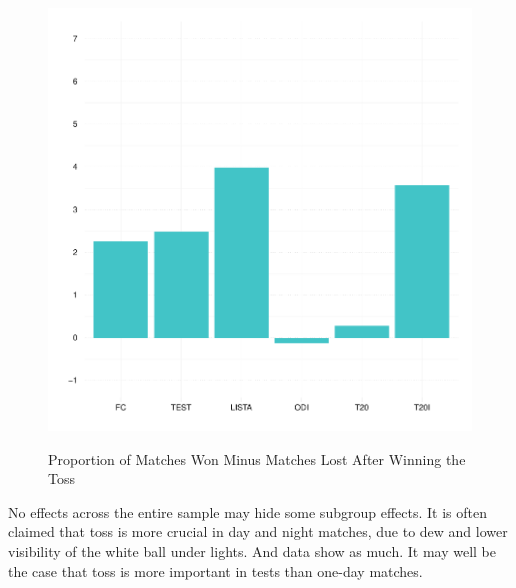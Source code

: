 \documentclass[11pt]{article}
\begin{document}
\begin{figure}[htbp]
\centering
\caption{Proportion of Matches Won Minus Matches Lost After Winning the Toss}
\includegraphics[scale=.75]{../figs/winbyType.pdf}
\label{fig:summary}
\end{figure}

No effects across the entire sample may hide some subgroup effects. It is often claimed that toss is more crucial in day and night matches, due to dew and lower visibility of the white ball under lights. And data show as much. It may well be the case that toss is more important in tests than one-day matches.
\end{document}
